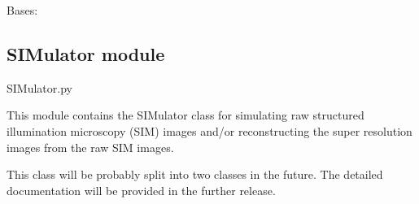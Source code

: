 \documentclass[letterpaper,10pt,english]{sphinxmanual}
\begin{document}
\begin{fulllineitems}

\begin{fulllineitems}
\label{\detokenize{source/ProcessorSIM:ProcessorSIM.ProcessorSIM.compute_sim_support}}
\pysigstartsignatures
\pysiglinewithargsret
{}
{}
{}
\pysigstopsignatures
\end{fulllineitems}


\end{fulllineitems}


\begin{fulllineitems}
\label{\detokenize{source/ProcessorSIM:ProcessorSIM.ProcessorTrue3dSIM}}
\pysigstartsignatures
\pysiglinewithargsret
{}
{\sphinxparamcomma {}}
{}
\pysigstopsignatures
\sphinxAtStartPar
Bases: {\hyperref[\detokenize{source/ProcessorSIM:ProcessorSIM.ProcessorSIM}]{}}


\end{fulllineitems}


\sphinxstepscope


\subsection{SIMulator module}
\label{\detokenize{source/SIMulator:module-SIMulator}}\label{\detokenize{source/SIMulator:simulator-module}}\label{\detokenize{source/SIMulator::doc}}
\sphinxAtStartPar
SIMulator.py

\sphinxAtStartPar
This module contains the SIMulator class for simulating raw
structured illumination microscopy (SIM) images and/or reconstructing
the super resolution images from the raw SIM images.

\sphinxAtStartPar
This class will be probably split into two classes in the future. The detailed documentation will be provided in the further release.
\end{document}
